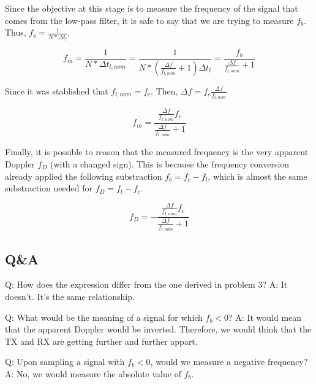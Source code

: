 Since the objective at this stage is to measure the frequency of the signal that
comes from the low-pass filter, it is safe to say that we are trying to measure
$f_b$. Thus, $f_b = \frac{1}{N*\Delta t_l}$.

\begin{equation}
	f_m = \frac{1}{N * \Delta t_{l,nom}}
	= \frac{1}{N *(\frac{\Delta f}{f_{l,nom}} + 1) \Delta t_l}
	= \frac{f_b}{\frac{\Delta f}{f_{l,nom}} + 1}
\end{equation}

Since it was stablished that $f_{l,nom} = f_c$.
Then, $\Delta f = f_c \frac{\Delta f}{f_{l,nom}}$

\begin{equation}
	f_m = \frac{\frac{\Delta f}{f_{l,nom}} f_c}{\frac{\Delta f}{f_{l,nom}} + 1}
\end{equation}

Finally, it is possible to reason that the measured frequency is the very
apparent Doppler $f_D$ (with a changed sign). This is because the frequency
conversion already applied the following substraction $f_b = f_c - f_l$, which
is almost the same substraction needed for $f_D = f_l - f_c$.

\begin{equation}
	f_D = -\frac{\frac{\Delta f}{f_{l,nom}} f_c}{\frac{\Delta f}{f_{l,nom}} + 1}
\end{equation}


\subsection{Q&A}

Q: How does the expression differ from the one derived in problem 3?
A: It doesn't. It's the same relationship.

Q: What would be the meaning of a signal for which $f_b < 0$?
A: It would mean that the apparent Doppler would be inverted. Therefore, we
would think that the TX and RX are getting further and further appart.

Q: Upon sampling a signal with $f_b < 0$, would we measure a negative frequency?
A: No, we would measure the absolute value of $f_b$.

